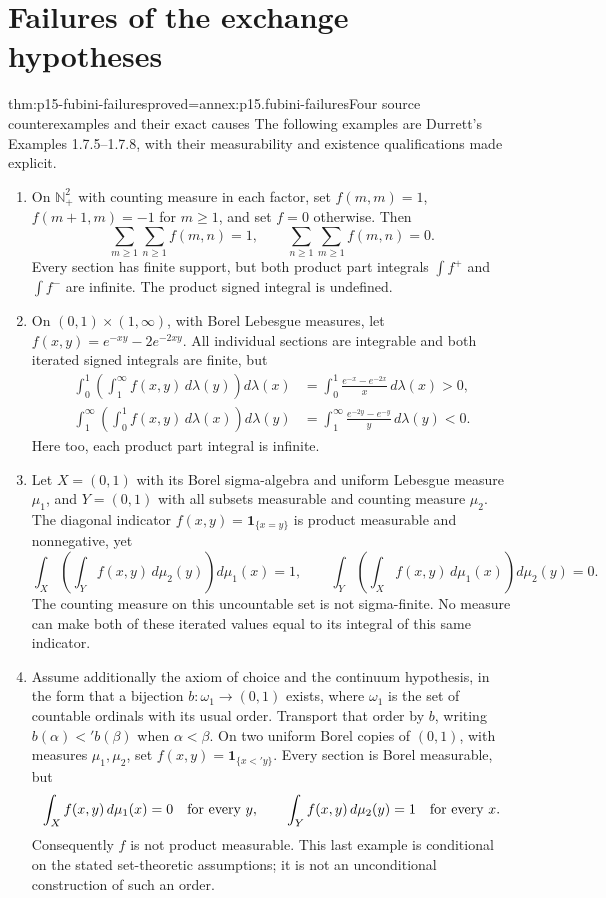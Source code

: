 \section{Failures of the exchange hypotheses}
\label{sec:p15-product-failures}

\begin{hbtheorem}{thm:p15-fubini-failures}{proved=annex:p15.fubini-failures}{Four source counterexamples and their exact causes}
The following examples are Durrett's Examples 1.7.5--1.7.8, with their
measurability and existence qualifications made explicit.
\begin{enumerate}
\item On \(\mathbb N_+^2\) with counting measure in each factor, set
 \(f(m,m)=1\), \(f(m+1,m)=-1\) for \(m\geq1\), and set
 \(f=0\) otherwise. Then
 \[
  \sum_{m\geq1}\sum_{n\geq1}f(m,n)=1,
  \qquad
  \sum_{n\geq1}\sum_{m\geq1}f(m,n)=0.
 \]
 Every section has finite support, but both product part integrals
 \(\int f^+\) and \(\int f^-\) are infinite. The product signed
 integral is undefined.
\item On \((0,1)\times(1,\infty)\), with Borel Lebesgue measures,
 let \(f(x,y)=e^{-xy}-2e^{-2xy}\). All individual sections are
 integrable and both iterated signed integrals are finite, but
 \[
 \begin{aligned}
 \int_0^1\left(\int_1^\infty f(x,y)\,d\lambda(y)\right)d\lambda(x)
   &=\int_0^1\frac{e^{-x}-e^{-2x}}x\,d\lambda(x)>0,\\
 \int_1^\infty\left(\int_0^1 f(x,y)\,d\lambda(x)\right)d\lambda(y)
   &=\int_1^\infty\frac{e^{-2y}-e^{-y}}y\,d\lambda(y)<0.
 \end{aligned}
 \]
 Here too, each product part integral is infinite.
\item Let \(X=(0,1)\) with its Borel sigma-algebra and uniform
 Lebesgue measure \(\mu_1\), and \(Y=(0,1)\) with all subsets measurable and
 counting measure \(\mu_2\). The diagonal indicator \(f(x,y)=\mathbf1_{\{x=y\}}\)
 is product measurable and nonnegative, yet
 \[
  \int_X\left(\int_Yf(x,y)\,d\mu_2(y)\right)d\mu_1(x)=1,
  \qquad
  \int_Y\left(\int_Xf(x,y)\,d\mu_1(x)\right)d\mu_2(y)=0.
 \]
 The counting measure on this uncountable set is not sigma-finite.
 No measure can make both of these iterated values equal to its integral
 of this same indicator.
\item Assume additionally the axiom of choice and the continuum
 hypothesis, in the form that a bijection
 \(b:\omega_1\to(0,1)\) exists, where \(\omega_1\) is the set
 of countable ordinals with its usual order. Transport that order by
 \(b\), writing \(b(\alpha)<'b(\beta)\) when \(\alpha<\beta\).
 On two uniform Borel copies of \((0,1)\), with measures
 \(\mu_1,\mu_2\), set
 \(f(x,y)=\mathbf1_{\{x<'y\}}\). Every section is Borel measurable,
 but
 \[
  \int_X f(x,y)\,d\mu_1(x)=0\quad\hbox{for every }y,
  \qquad
  \int_Y f(x,y)\,d\mu_2(y)=1\quad\hbox{for every }x.
 \]
 Consequently \(f\) is not product measurable. This last example is
 conditional on the stated set-theoretic assumptions; it is not an
 unconditional construction of such an order.
\end{enumerate}
\end{hbtheorem}

